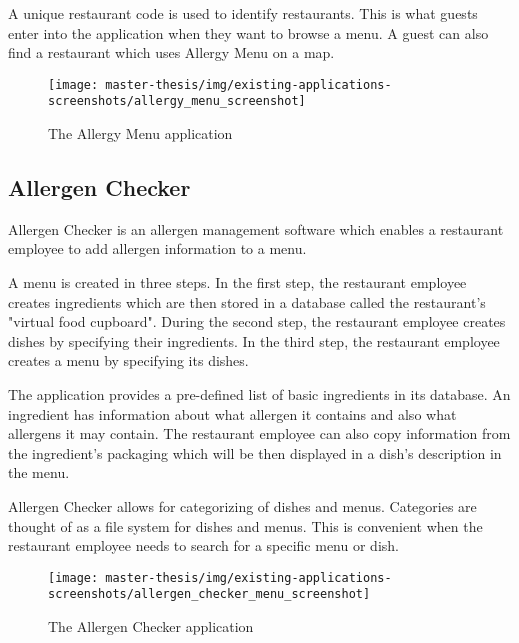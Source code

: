   A unique restaurant code is used to identify restaurants. 
  This is what guests enter into the application when they want to browse a menu.
  A guest can also find a restaurant which uses Allergy Menu on a map.

  \newpage

  \begin{figure}[h]
    \centering
    \texttt{[image: master-thesis/img/existing-applications-screenshots/allergy\_menu\_screenshot]}
    \caption{The Allergy Menu application}
  \end{figure}

\subsection*{Allergen Checker}
  Allergen Checker is an allergen management software which enables a restaurant employee to add allergen information to a menu.
  
  A menu is created in three steps.
  In the first step, the restaurant employee creates ingredients which are then stored in a database called the restaurant's "virtual food cupboard".
  During the second step, the restaurant employee creates dishes by specifying their ingredients.
  In the third step, the restaurant employee creates a menu by specifying its dishes.
  
  The application provides a pre-defined list of basic ingredients in its database.
  An ingredient has information about what allergen it contains and also what allergens it may contain. 
  The restaurant employee can also copy information from the ingredient's packaging which will be then displayed in a dish's description in the menu.
  
  Allergen Checker allows for categorizing of dishes and menus. 
  Categories are thought of as a file system for dishes and menus.
  This is convenient when the restaurant employee needs to search for a specific menu or dish.

  \begin{figure}[h]
    \centering
    \texttt{[image: master-thesis/img/existing-applications-screenshots/allergen\_checker\_menu\_screenshot]}
    \caption{The Allergen Checker application}
  \end{figure}

